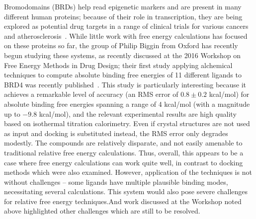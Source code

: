 \documentclass[aps,pre,twocolumn,nofootinbib,superscriptaddress,10pt, final,tightenlines]{revtex4-1}
\begin{document}
Bromodomains (BRDs) help read epigenetic markers and are present in many different human proteins; because of their role in transcription, they are being explored as potential drug targets in a range of clinical trials for various cancers and atherosclerosis~\cite{aldeghi_accurate_2016}. 
While little work with free energy calculations has focused on these proteins so far, the group of Philip Biggin from Oxford has recently begun studying these systems, as recently discussed at the 2016 Workshop on Free Energy Methods in Drug Design; their first study applying alchemical techniques to compute absolute binding free energies of 11 different ligands to BRD4 was recently published~\cite{aldeghi_accurate_2016}. 
This study is particularly interesting because it achieves a remarkable level of accuracy (an RMS error of $0.8\pm0.2$ kcal/mol) for absolute binding free energies spanning a range of 4 kcal/mol (with a magnitude up to $-9.8$ kcal/mol), and the relevant experimental results are high quality based on isothermal titration calorimetry. 
Even if crystal structures are not used as input and docking is substituted instead, the RMS error only degrades modestly. The compounds are relatively disparate, and not easily amenable to traditional relative free energy calculations. 
Thus, overall, this appears to be a case where free energy calculations can work quite well, in contrast to docking methods which were also examined. 
However, application of the techniques is not without challenges -- some ligands have multiple plausible binding modes, necessitating several calculations. 
This system would also pose severe challenges for relative free energy techniques.And work discussed at the Workshop noted above highlighted other challenges which are still to be resolved. 
\end{document}
